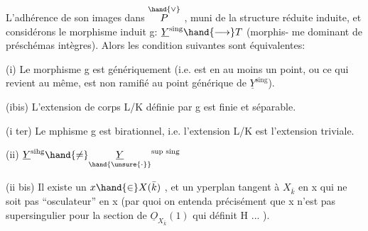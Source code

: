 
L'adhérence de son images dans $\overset{\hand{\vee}}{P}$ , muni de la structure réduite
induite, et considérons le morphisme induit g: $\underline{Y}^{\text{sing}} \hand{\longrightarrow} T$  (morphis-%
me dominant de préschémas  intègres). Alors les condition
 suivantes sont équivalentes:

(i) Le morphisme g est génériquement   (i.e. est   en au moins un point, ou ce qui revient au même, est  non ramifié
au point générique de $\underline{Y}^{\text{sing}}$).

(ibis) L'extension de corps L/K définie par g est finie et
séparable.

(i ter) Le mphisme g est birationnel, i.e. l'extension L/K est
l'extension triviale.

(ii) $\underline{Y}^{\text{sihg}} \hand{\neq} \underset{\hand{\unsure{\cdot}}}{\underline{Y}}^{\text{sup sing}}$ 

(ii bis) Il existe un $x \hand{\in} X(\bar{k})$ , et un yperplan tangent  à $X_{\bar{k}}$
en x qui ne soit pas ``osculateur'' en x (par quoi on entenda précisément
que x n'est pas supersingulier pour la section de $\underline{O}_{X_{\bar{k}}}(1)$ qui définit
H ... ).

